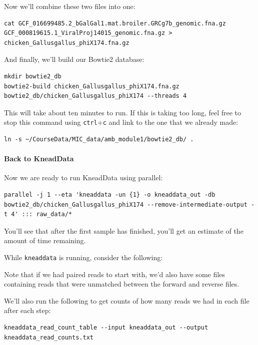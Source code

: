 \documentclass[
]{book}
\begin{document}
Now we'll combine these two files into one:

\begin{verbatim}
cat GCF_016699485.2_bGalGal1.mat.broiler.GRCg7b_genomic.fna.gz GCF_000819615.1_ViralProj14015_genomic.fna.gz > chicken_Gallusgallus_phiX174.fna.gz
\end{verbatim}

And finally, we'll build our Bowtie2 database:

\begin{verbatim}
mkdir bowtie2_db
bowtie2-build chicken_Gallusgallus_phiX174.fna.gz bowtie2_db/chicken_Gallusgallus_phiX174 --threads 4
\end{verbatim}

This will take about ten minutes to run. If this is taking too long, feel free to stop this command using \texttt{ctrl}+\texttt{c} and link to the one that we already made:

\begin{verbatim}
ln -s ~/CourseData/MIC_data/amb_module1/bowtie2_db/ .
\end{verbatim}

\paragraph{Back to KneadData}\label{back-to-kneaddata}

Now we are ready to run KneadData using parallel:

\begin{verbatim}
parallel -j 1 --eta 'kneaddata -un {1} -o kneaddata_out -db bowtie2_db/chicken_Gallusgallus_phiX174 --remove-intermediate-output -t 4' ::: raw_data/*
\end{verbatim}

You'll see that after the first sample has finished, you'll get an estimate of the amount of time remaining.

While \texttt{kneaddata} is running, consider the following:

Note that if we had paired reads to start with, we'd also have some files containing reads that were unmatched between the forward and reverse files.

We'll also run the following to get counts of how many reads we had in each file after each step:

\begin{verbatim}
kneaddata_read_count_table --input kneaddata_out --output kneaddata_read_counts.txt
\end{verbatim}
\end{document}
